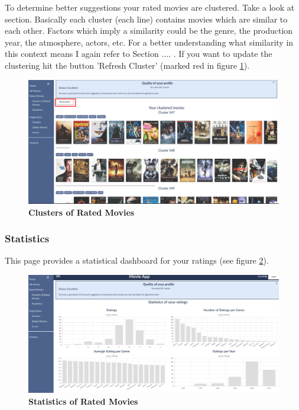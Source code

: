 \documentclass{article}
\begin{document}
To determine better suggestions your rated movies are clustered. Take a look at section. Basically each cluster (each line) contains movies which are similar to each other. Factors which imply a similarity could be the genre, the production year, the atmosphere, actors, etc. For a better understanding what similarity in this context means I again refer to Section .... .
If you want to update the clustering hit the button 'Refresh Cluster' (marked red in figure \ref{fig_rated_movies_clustered}).
\begin{figure}[t!]
\includegraphics[scale=0.3]{screenshots_app/rated_movies_clustered.png}
\caption{\textbf{Clusters of Rated Movies}}\label{fig_rated_movies_clustered}
\end{figure}


\subsubsection{Statistics}

This page provides a statistical dashboard for your ratings (see figure \ref{fig_rated_movies_statistics}).
\begin{figure}[t!]
\includegraphics[scale=0.19]{screenshots_app/rated_movies_statistics.png}
\caption{\textbf{Statistics of Rated Movies}}\label{fig_rated_movies_statistics}
\end{figure}
\end{document}
